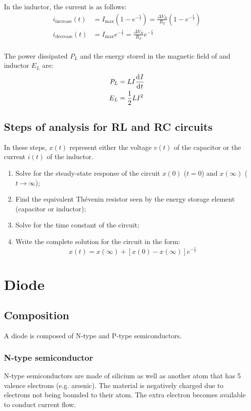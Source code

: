 \documentclass[10pt, twocolumn]{article}
\begin{document}
In the inductor, the current is as follows:
\begin{align*}
  i_\mathrm{increase}(t) & = I_\mathrm{max} \left( 1 - e^{-\frac{t}{\tau}} \right) = \frac{\Delta V_R }{R_T} \left( 1 - e^{-\frac{t}{\tau}} \right) \\
  i_\mathrm{decrease}(t) & = I_\mathrm{max} e^{-\frac{t}{\tau}} = \frac{\Delta V_R }{R_T} e^{-\frac{t}{\tau}}                                       \\
\end{align*}

The power dissipated \(P_L\) and the energy stored in the magnetic field of and inductor \(E_L\) are:
\begin{align*}
  P_L & = L I \frac{\mathrm{d}^{} I}{\mathrm{d}^{} t} \\
  E_L & = \frac{1}{2} L I^2
\end{align*}



\subsection{Steps of analysis for RL and RC circuits}
In these steps, \(x(t)\) represent either the voltage \(v(t)\) of the capacitor or the current \(i(t)\) of the inductor.
\begin{enumerate}
  \item Solve for the steady-state response of the circuit \(x(0)\) (\(t = 0\)) and \(x(\infty)\) (\(t \to \infty\));
  \item Find the equivalent Thévenin resistor seen by the energy storage element (capacitor or inductor);
  \item Solve for the time constant of the circuit;
  \item Write the complete solution for the circuit in the form:
        \[
          x(t) = x(\infty) + [x(0) - x(\infty)]e^{-\frac{t}{\tau}}
        \]
\end{enumerate}



\section{Diode}
\subsection{Composition}
A diode is composed of N-type and P-type semiconductors.


\subsubsection{N-type semiconductor}
N-type semiconductors are made of silicium as well as another atom that has 5 valence electrons (e.g. arsenic).
The material is negatively charged due to electrons not being bounded to their atom.
The extra electron becomes available to conduct current flow.
\end{document}

